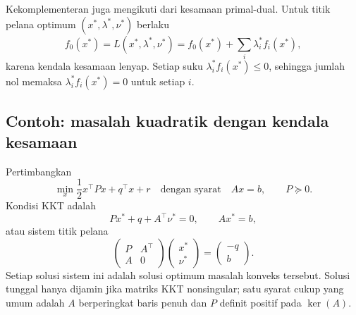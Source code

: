 Kekomplementeran juga mengikuti dari kesamaan primal-dual. Untuk titik pelana
optimum $(x^*,\lambda^*,\nu^*)$ berlaku
\begin{equation}
  f_0(x^*)
  =L(x^*,\lambda^*,\nu^*)
  =f_0(x^*)+\sum_i\lambda_i^*f_i(x^*),
\end{equation}
karena kendala kesamaan lenyap. Setiap suku
$\lambda_i^*f_i(x^*)\leq0$, sehingga jumlah nol memaksa
$\lambda_i^*f_i(x^*)=0$ untuk setiap $i$.

\subsection{Contoh: masalah kuadratik dengan kendala kesamaan}

Pertimbangkan
\begin{equation}
  \min_x \frac12 x^\top P x+q^\top x+r
  \quad\text{dengan syarat}\quad Ax=b,
  \qquad P\succeq0.
\end{equation}
Kondisi KKT adalah
\begin{equation}
  Px^*+q+A^\top\nu^*=0,
  \qquad Ax^*=b,
\end{equation}
atau sistem titik pelana
\begin{equation}
  \begin{pmatrix}P&A^\top\\A&0\end{pmatrix}
  \begin{pmatrix}x^*\\\nu^*\end{pmatrix}
  =\begin{pmatrix}-q\\b\end{pmatrix}.
\end{equation}
Setiap solusi sistem ini adalah solusi optimum masalah konveks tersebut.
Solusi tunggal hanya dijamin jika matriks KKT nonsingular; satu syarat cukup
yang umum adalah $A$ berperingkat baris penuh dan $P$ definit positif pada
$\ker(A)$.
